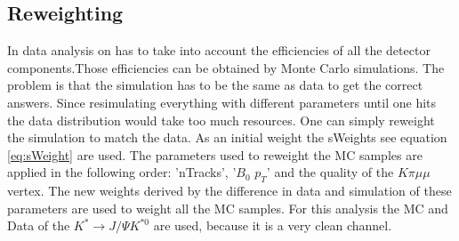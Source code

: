 \documentclass[english]{uzhpub}
\begin{document}
\subsection{Reweighting}
In data analysis on has to take into account the efficiencies of all the detector components.Those efficiencies can be obtained by Monte Carlo simulations. The problem is that the simulation has to be the same as data to get the correct answers. Since resimulating everything with different parameters until one hits the data distribution would take too much resources. One can simply reweight the simulation to match the data. As an initial weight the sWeights see equation \ref{eq:sWeight} are used. The parameters used to reweight the MC samples are applied in the following order: 'nTracks', '$B_0$ $p_T$' and the quality of the $K \pi \mu \mu$ vertex. The new weights derived by the difference in data and simulation of these parameters are used to weight all the MC samples. For this analysis the MC and Data of the $K^* \rightarrow J/ \Psi K^{*0}$ are used, because it is a very clean channel.









\end{document}
